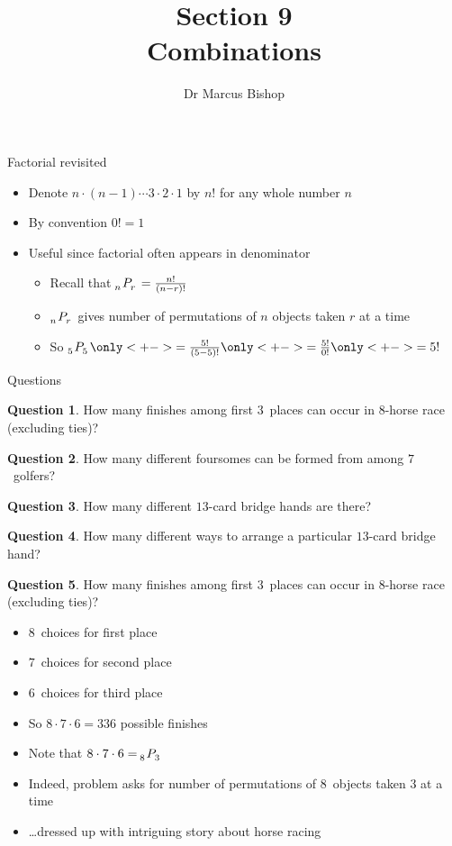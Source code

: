\documentclass[handout]{beamer}
\title[\S9]{Section 9\\Combinations}
\author{Dr Marcus Bishop}
\theoremstyle{definition}
\newtheorem{question}{Question}
\newcommand\npr[2]{\tensor[_{#1}]P{_{#2}}}
\begin{document}
\begin{frame}\titlepage\end{frame}
\LogoOff

\begin{frame}{Factorial revisited}
\begin{itemize}
\item Denote $n\cdot\left(n-1\right)\cdots 3\cdot 2\cdot 1$
by \alert{$n!$} for any whole number $n$
\item By convention $0!=1$
\item Useful since factorial often appears in denominator
\begin{example}
\begin{itemize}
\item Recall that $\npr{n}{r}=\frac{n!}{\left(n-r\right)!}$
\item $\npr{n}{r}$ gives number of permutations of $n$
objects taken $r$ at a time
\item So $\npr{5}{5}
\only<+->{=\frac{5!}{\left(5-5\right)!}}
\only<+->{=\frac{5!}{0!}}
\only<+->{=5!}$
\end{itemize}
\end{example}
\end{itemize}
\end{frame}

\begin{frame}{Questions}
\begin{question}
How many finishes among first $3$~places
can occur in $8$-horse race (excluding ties)?
\end{question}
\begin{question}
How many different foursomes can be formed
from among $7$~golfers?
\end{question}
\begin{question}
How many different $13$-card bridge hands are there?
\end{question}
\begin{question}
How many different ways to arrange a particular $13$-card
bridge hand?
\end{question}
\end{frame}

\begin{frame}
\begin{question}
How many finishes among first $3$~places
can occur in $8$-horse race (excluding ties)?
\end{question}
\begin{itemize}
\item $8$~choices for first place
\item $7$~choices for second place
\item $6$~choices for third place
\item So $8\cdot 7\cdot 6=336$ possible finishes
\item Note that $8\cdot 7\cdot 6=\npr{8}{3}$
\item Indeed, problem asks for number of permutations
of $8$~objects taken $3$ at a time
\item \dots dressed up with intriguing story about horse racing
\end{itemize}
\end{frame}
\end{document}
